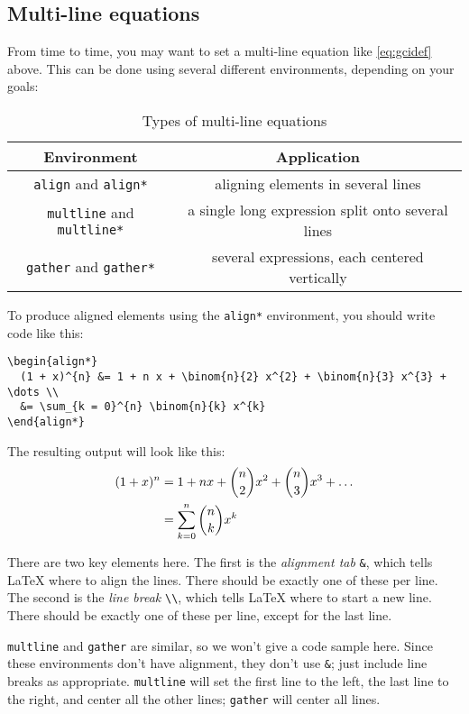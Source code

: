 \documentclass{article}
\newcommand*{\code}[1]{\texttt{#1}}
\begin{document}
\subsection{Multi-line equations}
From time to time, you may want to set a multi-line equation like \cref{eq:gcidef} above.
This can be done using several different environments, depending on your goals:
\begin{table}[htb]
  \centering
  \begin{tabular}{c c}
    \toprule
    Environment & Application \\ \midrule
    \code{align} and \code{align*} & aligning elements in several lines \\
    \code{multline} and \code{multline*} & a single long expression split onto several lines \\
    \code{gather} and \code{gather*} & several expressions, each centered vertically \\
    \bottomrule
  \end{tabular}
  \caption{Types of multi-line equations}
  \label{tab:multiline}
\end{table}

To produce aligned elements using the \code{align*} environment, you should write code like this:
\begin{verbatim}
\begin{align*}
  (1 + x)^{n} &= 1 + n x + \binom{n}{2} x^{2} + \binom{n}{3} x^{3} + \dots \\
  &= \sum_{k = 0}^{n} \binom{n}{k} x^{k}
\end{align*}
\end{verbatim}
The resulting output will look like this:
\begin{align}
  (1 + x)^{n} &= 1 + n x + \binom{n}{2} x^{2} + \binom{n}{3} x^{3} + \dots \notag \\
  &= \sum_{k = 0}^{n} \binom{n}{k} x^{k} \label{eq:binom}
\end{align}

There are two key elements here.
The first is the \emph{alignment tab} \code{\&}, which tells \LaTeX{} where to align the lines.
There should be exactly one of these per line.
The second is the \emph{line break} \code{\textbackslash{}\textbackslash{}}, which tells \LaTeX{} where to start a new line.
There should be exactly one of these per line, except for the last line.

\code{multline} and \code{gather} are similar, so we won't give a code sample here.
Since these environments don't have alignment, they don't use \code{\&}; just include line breaks as appropriate.
\code{multline} will set the first line to the left, the last line to the right, and center all the other lines; \code{gather} will center all lines.
\end{document}
